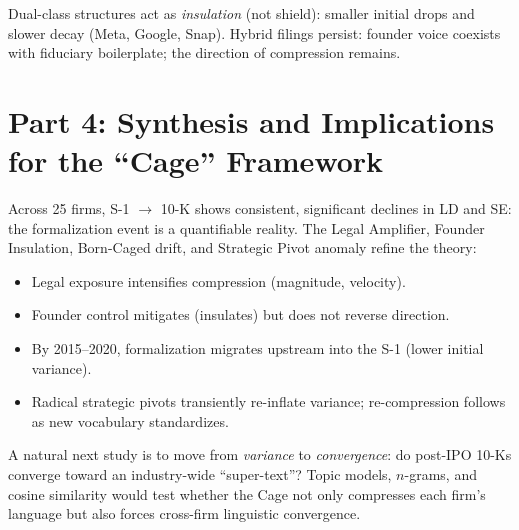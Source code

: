 \documentclass[12pt]{article}
\begin{document}
Dual-class structures act as \emph{insulation} (not shield): smaller initial drops and slower decay (Meta, Google, Snap). Hybrid filings persist: founder voice coexists with fiduciary boilerplate; the direction of compression remains.

\section*{Part 4: Synthesis and Implications for the ``Cage'' Framework}

Across 25 firms, S-1 $\to$ 10-K shows consistent, significant declines in LD and SE: the formalization event is a quantifiable reality. The Legal Amplifier, Founder Insulation, Born-Caged drift, and Strategic Pivot anomaly refine the theory:
\begin{itemize}
    \item Legal exposure intensifies compression (magnitude, velocity).
    \item Founder control mitigates (insulates) but does not reverse direction.
    \item By 2015--2020, formalization migrates upstream into the S-1 (lower initial variance).
    \item Radical strategic pivots transiently re-inflate variance; re-compression follows as new vocabulary standardizes.
\end{itemize}

A natural next study is to move from \emph{variance} to \emph{convergence}: do post-IPO 10-Ks converge toward an industry-wide ``super-text''? Topic models, $n$-grams, and cosine similarity would test whether the Cage not only compresses each firm's language but also forces cross-firm linguistic convergence.
\end{document}
